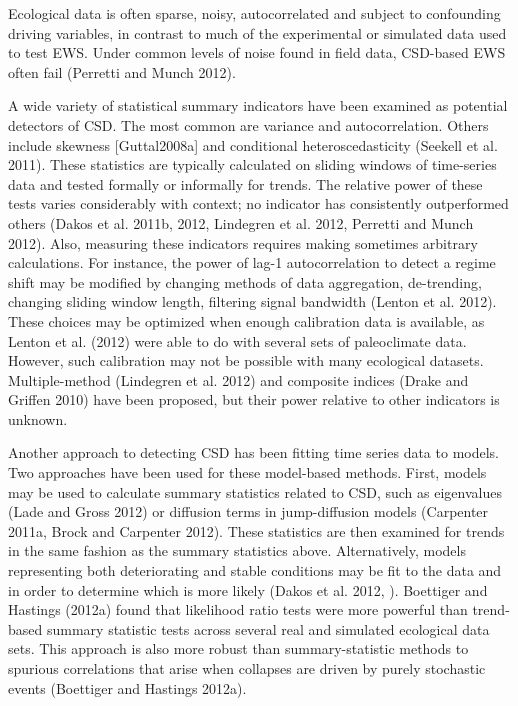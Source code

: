 \documentclass{article}
\begin{document}
Ecological data is often sparse, noisy, autocorrelated and subject to
confounding driving variables, in contrast to much of the experimental
or simulated data used to test EWS. Under common levels of noise found
in field data, CSD-based EWS often fail (Perretti and Munch 2012).

A wide variety of statistical summary indicators have been examined as
potential detectors of CSD. The most common are variance and
autocorrelation. Others include skewness {[}Guttal2008a{]} and
conditional heteroscedasticity (Seekell et al. 2011). These statistics
are typically calculated on sliding windows of time-series data and
tested formally or informally for trends. The relative power of these
tests varies considerably with context; no indicator has consistently
outperformed others (Dakos et al. 2011b, 2012, Lindegren et al. 2012,
Perretti and Munch 2012). Also, measuring these indicators requires
making sometimes arbitrary calculations. For instance, the power of
lag-1 autocorrelation to detect a regime shift may be modified by
changing methods of data aggregation, de-trending, changing sliding
window length, filtering signal bandwidth (Lenton et al. 2012). These
choices may be optimized when enough calibration data is available, as
Lenton et al. (2012) were able to do with several sets of paleoclimate
data. However, such calibration may not be possible with many ecological
datasets. Multiple-method (Lindegren et al. 2012) and composite indices
(Drake and Griffen 2010) have been proposed, but their power relative to
other indicators is unknown.

Another approach to detecting CSD has been fitting time series data to
models. Two approaches have been used for these model-based methods.
First, models may be used to calculate summary statistics related to
CSD, such as eigenvalues (Lade and Gross 2012) or diffusion terms in
jump-diffusion models (Carpenter 2011a, Brock and Carpenter 2012). These
statistics are then examined for trends in the same fashion as the
summary statistics above. Alternatively, models representing both
deteriorating and stable conditions may be fit to the data and in order
to determine which is more likely (Dakos et al. 2012, ). Boettiger and
Hastings (2012a) found that likelihood ratio tests were more powerful
than trend-based summary statistic tests across several real and
simulated ecological data sets. This approach is also more robust than
summary-statistic methods to spurious correlations that arise when
collapses are driven by purely stochastic events (Boettiger and Hastings
2012a).
\end{document}
